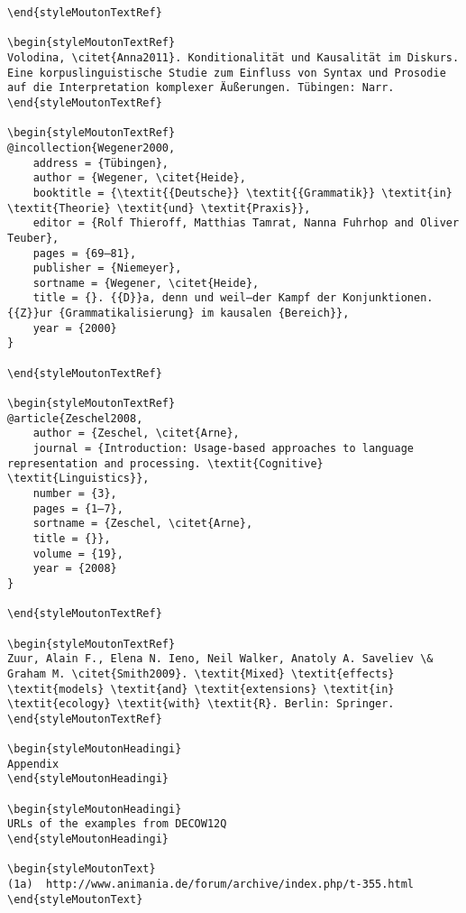 \begin{styleMoutonHeadingRef}
\begin{verbatim}
\end{styleMoutonTextRef}

\begin{styleMoutonTextRef}
Volodina, \citet{Anna2011}. Konditionalität und Kausalität im Diskurs. Eine korpuslinguistische Studie zum Einfluss von Syntax und Prosodie auf die Interpretation komplexer Äußerungen. Tübingen: Narr.
\end{styleMoutonTextRef}

\begin{styleMoutonTextRef}
@incollection{Wegener2000,
	address = {Tübingen},
	author = {Wegener, \citet{Heide},
	booktitle = {\textit{{Deutsche}} \textit{{Grammatik}} \textit{in} \textit{Theorie} \textit{und} \textit{Praxis}},
	editor = {Rolf Thieroff, Matthias Tamrat, Nanna Fuhrhop and Oliver Teuber},
	pages = {69–81},
	publisher = {Niemeyer},
	sortname = {Wegener, \citet{Heide},
	title = {}. {{D}}a, denn und weil—der Kampf der Konjunktionen. {{Z}}ur {Grammatikalisierung} im kausalen {Bereich}},
	year = {2000}
}

\end{styleMoutonTextRef}

\begin{styleMoutonTextRef}
@article{Zeschel2008,
	author = {Zeschel, \citet{Arne},
	journal = {Introduction: Usage-based approaches to language representation and processing. \textit{Cognitive} \textit{Linguistics}},
	number = {3},
	pages = {1–7},
	sortname = {Zeschel, \citet{Arne},
	title = {}},
	volume = {19},
	year = {2008}
}

\end{styleMoutonTextRef}

\begin{styleMoutonTextRef}
Zuur, Alain F., Elena N. Ieno, Neil Walker, Anatoly A. Saveliev \& Graham M. \citet{Smith2009}. \textit{Mixed} \textit{effects} \textit{models} \textit{and} \textit{extensions} \textit{in} \textit{ecology} \textit{with} \textit{R}. Berlin: Springer.
\end{styleMoutonTextRef}

\begin{styleMoutonHeadingi}
Appendix
\end{styleMoutonHeadingi}

\begin{styleMoutonHeadingi}
URLs of the examples from DECOW12Q
\end{styleMoutonHeadingi}

\begin{styleMoutonText}
(1a)  http://www.animania.de/forum/archive/index.php/t-355.html
\end{styleMoutonText}


\end{verbatim}
\end{styleMoutonHeadingRef}
